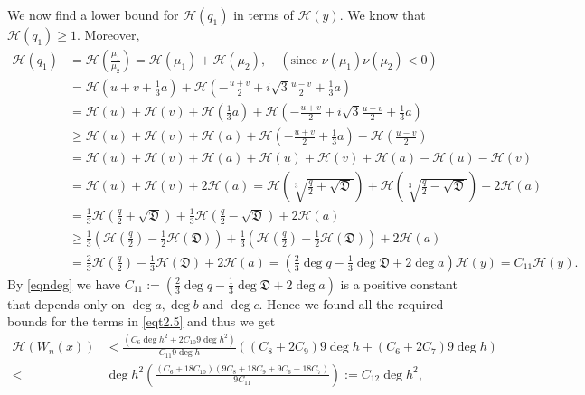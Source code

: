 \documentclass[12pt]{amsart}
\begin{document}
We now find a lower bound for $\mathcal{H}(q_1)$ in terms of $\mathcal{H}(y)$. We know that $\mathcal{H}(q_1)\geq 1$. Moreover,
\begin{align*}
   \mathcal{H}(q_1)&=\mathcal{H}\left(\frac{\mu_1}{\mu_2}\right)=\mathcal{H}(\mu_1)+\mathcal{H}(\mu_2), \quad(\text{since $\nu(\mu_1)\nu(\mu_2)<0$})\\ 
   &=\mathcal{H}(u+v+\frac{1}{3}a)+\mathcal{H}(-\frac{u+v}{2}+i\sqrt{3}\frac{u-v}{2}+\frac{1}{3}a)\\
   &=\mathcal{H}(u)+\mathcal{H}(v)+\mathcal{H}(\frac{1}{3}a)+\mathcal{H}\left(-\frac{u+v}{2}+i\sqrt{3}\frac{u-v}{2}+\frac{1}{3}a\right)\\
   &\geq \mathcal{H}(u)+\mathcal{H}(v)+\mathcal{H}(a)+\mathcal{H}\left(-\frac{u+v}{2}+\frac{1}{3}a\right)-\mathcal{H}\left(\frac{u-v}{2}\right)\\
   &= \mathcal{H}(u)+\mathcal{H}(v)+\mathcal{H}(a)+\mathcal{H}(u)+\mathcal{H}(v)+\mathcal{H}(a)-\mathcal{H}(u)-\mathcal{H}(v)\\
   &= \mathcal{H}(u)+\mathcal{H}(v)+2\mathcal{H}(a)=\mathcal{H}\left(\sqrt[3]{\frac{q}{2}+\sqrt{\mathfrak{D}}}\right)+\mathcal{H}\left(\sqrt[3]{\frac{q}{2}-\sqrt{\mathfrak{D}}}\right)+2\mathcal{H}(a)\\
   &=\frac{1}{3}\mathcal{H}\left(\frac{q}{2}+\sqrt{\mathfrak{D}}\right)+\frac{1}{3}\mathcal{H}\left(\frac{q}{2}-\sqrt{\mathfrak{D}}\right)+2\mathcal{H}(a)\\
   &\geq \frac{1}{3}\left(\mathcal{H}\left(\frac{q}{2}\right)-\frac{1}{2}\mathcal{H}(\mathfrak{D})\right)+\frac{1}{3}\left(\mathcal{H}\left(\frac{q}{2}\right)-\frac{1}{2}\mathcal{H}(\mathfrak{D})\right)+2\mathcal{H}(a)\\
   &=\frac{2}{3}\mathcal{H}\left(\frac{q}{2}\right)-\frac{1}{3}\mathcal{H}(\mathfrak{D})+2\mathcal{H}(a)=\left(\frac{2}{3}\deg q-\frac{1}{3}\deg \mathfrak{D}+ 2\deg a\right)\mathcal{H}(y)=C_{11}\mathcal{H}(y).
\end{align*}
  By \eqref{eqndeg} we have $C_{11}:=(\frac{2}{3}\deg q-\frac{1}{3}\deg \mathfrak{D}+ 2\deg a)$ is a positive constant that depends only on $\deg a, \deg b$ and $\deg c$.
Hence we found all the required bounds for the terms in \eqref{eqt2.5} and thus we get
\begin{align}\label{eq29}
    \mathcal{H}(W_n(x))&< \frac{(C_6 \deg h^2+ 2C_{10}9\deg h^2)}{C_{11}9\deg h}\left((C_8+2C_9)9\deg h+ (C_6+2C_7)9\deg h\right)\nonumber\\
    <&\deg h^2 \left(\frac{(C_6+18C_{10})(9C_8+18C_9+9C_6+18C_7)}{9C_{11}}\right):=C_{12}\deg h^2,
\end{align}
\end{document}
